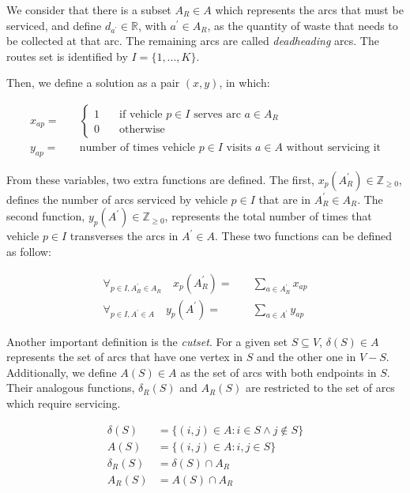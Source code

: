We consider that there is a subset $A_R \in A$ which represents the arcs that
must be serviced, and define $d_{a^\prime} \in \mathbb{R}$, with $a^\prime \in
A_R$, as the quantity of waste that needs to be collected at that arc. The
remaining arcs are called \textit{deadheading} arcs. The routes set is
identified by $I = \{1, ..., K\}$.

Then, we define a solution as a pair $(x, y)$, in which:

\begin{align*}
x_{ap} = & \quad \left\{
	\begin{array}{ll}
		1 & \quad \mbox{if vehicle $p \in I$ serves arc $a \in A_R$} \\
		0 & \quad \mbox{otherwise}
	\end{array}
	\right. \\
y_{ap} = & \quad \mbox{number of times vehicle $p \in I$ visits $a \in A$ without servicing it}
\end{align*}

From these variables, two extra functions are defined. The first,
$x_p(A_R^\prime) \in \mathbb{Z}_{\geq0}$, defines the number of arcs serviced
by vehicle $p \in I$ that are in $A_R^\prime \in A_R$. The second function,
$y_p(A^\prime) \in \mathbb{Z}_{\geq0}$, represents the total number of times
that vehicle $p \in I$ transverses the arcs in $A^\prime \in A$. These two functions can be defined as follow:

\begin{align}
	\forall_{p \in I, A_R^\prime \in A_R}	\quad x_p(A_R^\prime) = & \quad \sum_{a \in A_R^\prime} x_{ap} \\
	\forall_{p \in I, A^\prime \in A}	\quad y_p(A^\prime) =   & \quad \sum_{a \in A^\prime} y_{ap}
\end{align}

Another important definition is the \textit{cutset}. For a given set $S
\subseteq V$, $\delta(S) \in A$ represents the set of arcs that have one vertex
in $S$ and the other one in $V - S$. Additionally, we define $A(S) \in A$ as
the set of arcs with both endpoints in $S$. Their analogous functions,
$\delta_R(S)$ and $A_R(S)$ are restricted to the set of arcs which require
servicing.

\begin{align}
	\delta(S)	&= \{ (i, j) \in A : i \in S \wedge j \notin S \} \\
	A(S)		&= \{ (i, j) \in A : i,j \in S \} \\
	\delta_R(S)	&= \delta(S) \cap A_R \\
	A_R(S)		&= A(S) \cap A_R
\end{align}

